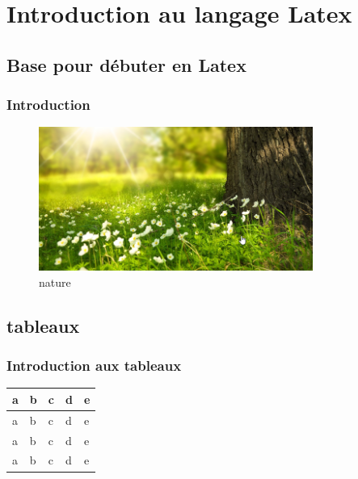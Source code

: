 \documentclass{report}
\begin{document}
\tableofcontents
\part{Introduction au langage Latex}
\chapter{Base pour débuter en Latex}
\section{Introduction}
\lipsum[1-2]
\begin{figure}
    \centering
    \includegraphics[width=0.8\textwidth]{nature.png}
    \caption{nature}
\end{figure}

\chapter{tableaux}
\section{Introduction aux tableaux}
\lipsum[1-2]
\begin{table}
    \centering
    \begin{tabular}{|l|l|l|l|l|}
        \hline
        a & b & c & d & e \\
        \hline
        a & b & c & d & e \\
        \hline
        a & b & c & d & e \\
        \hline
        a & b & c & d & e \\
        \hline
    \end{tabular}
\end{table}
\end{document}
